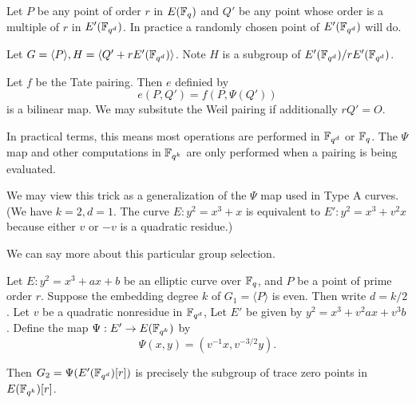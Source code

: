 Let $P$ be any point of order $r$ in $E(\mathbb{F}_q)$ and
$Q'$ be any point whose order is a multiple of $r$ in $E'(\mathbb{F}_{q^d})$.
In practice a randomly chosen point of $E'(\mathbb{F}_{q^d})$ will do.

Let $G = \langle P \rangle, H = \langle Q' + r E'(\mathbb{F}_{q^d}) \rangle$.
Note $H$ is a subgroup of $E'(\mathbb{F}_{q^d}) / rE'(\mathbb{F}_{q^d})$.

Let $f$ be the Tate pairing.
Then $e$ definied by
\[e(P,Q') = f(P, \Psi(Q')) \]
is a bilinear map.
We may subsitute the Weil pairing if additionally
$r Q' = O$.

In practical terms, this means most operations are performed in
$\mathbb{F}_{q^d}$  or $\mathbb{F}_q$. The $\Psi$ map and
other computations in $\mathbb{F}_{q^k}$ are only performed
when a pairing is being evaluated.

We may view this trick as a
generalization of the $\Psi$ map used in Type A curves.
(We have $k =2 , d = 1$.
The curve $E : y^2 = x^3 + x$ is equivalent to $E' : y^2 = x^3 + v^2 x$
because either $v$ or $-v$ is a quadratic residue.)

We can say more about this particular group selection.

\begin{theorem}
Let $E : y^2 = x^3 + a x + b$ be an elliptic curve over $\mathbb{F}_q$,
and $P$ be a point of prime order $r$.
Suppose the embedding degree $k$ of $G_1 = \langle P \rangle$ is even.
Then write $d = k / 2$. Let $v$ be a quadratic nonresidue in $\mathbb{F}_{q^d}$,
Let $E'$ be given by $y^2 = x^3 + v^2 a x + v^3 b$.
Define the map $\Psi:E'\rightarrow E(\mathbb{F}_{q^k})$ by
\[ \Psi(x,y) = (v^{-1}x, v^{-3/2}y) . \]

Then $G_2 = \Psi(E'(\mathbb{F}_{q^d})[r])$ is precisely the subgroup of trace zero points
in $E(\mathbb{F}_{q^k})[r]$.
\end{theorem}

